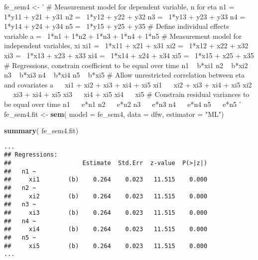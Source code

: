 \documentclass[]{interact}
\theoremstyle{plain}%
\theoremstyle{definition}
\theoremstyle{remark}
\newenvironment{Shaded}{\begin{snugshade}}{\end{snugshade}}
\newcommand{\DataTypeTok}[1]{\textcolor[rgb]{0.13,0.29,0.53}{#1}}
\newcommand{\KeywordTok}[1]{\textcolor[rgb]{0.13,0.29,0.53}{\textbf{#1}}}
\newcommand{\NormalTok}[1]{#1}
\newcommand{\StringTok}[1]{\textcolor[rgb]{0.31,0.60,0.02}{#1}}
\begin{document}
\singlespacing

\begin{Shaded}
\begin{Highlighting}[]
\NormalTok{fe_sem4 <-}\StringTok{ '}
\StringTok{# Measurement model for dependent variable, n for eta}
\StringTok{n1 =~ 1*y11 + y21 + y31}
\StringTok{n2 =~ 1*y12 + y22 + y32}
\StringTok{n3 =~ 1*y13 + y23 + y33}
\StringTok{n4 =~ 1*y14 + y24 + y34}
\StringTok{n5 =~ 1*y15 + y25 + y35}
\StringTok{# Define individual effects variable }
\StringTok{a =~ 1*n1 + 1*n2 + 1*n3 + 1*n4 + 1*n5}
\StringTok{# Measurement model for independent variables, xi }
\StringTok{xi1 =~ 1*x11 + x21 + x31 }
\StringTok{xi2 =~ 1*x12 + x22 + x32}
\StringTok{xi3 =~ 1*x13 + x23 + x33}
\StringTok{xi4 =~ 1*x14 + x24 + x34}
\StringTok{xi5 =~ 1*x15 + x25 + x35}
\StringTok{# Regressions, constrain coefficient to be equal over time}
\StringTok{n1 ~ b*xi1}
\StringTok{n2 ~ b*xi2 }
\StringTok{n3 ~ b*xi3}
\StringTok{n4 ~ b*xi4}
\StringTok{n5 ~ b*xi5}
\StringTok{# Allow unrestricted correlation between eta and covariates}
\StringTok{a ~~ xi1 + xi2 + xi3 + xi4 + xi5}
\StringTok{xi1 ~~ xi2 + xi3 + xi4 + xi5}
\StringTok{xi2 ~~ xi3 + xi4 + xi5}
\StringTok{xi3 ~~ xi4 + xi5}
\StringTok{xi4 ~~ xi5}
\StringTok{# Constrain residual variances to be equal over time}
\StringTok{n1 ~~ e*n1}
\StringTok{n2 ~~ e*n2}
\StringTok{n3 ~~ e*n3}
\StringTok{n4 ~~ e*n4}
\StringTok{n5 ~~ e*n5}
\StringTok{'}
\NormalTok{fe_sem4.fit <-}\StringTok{ }\KeywordTok{sem}\NormalTok{( }\DataTypeTok{model =}\NormalTok{ fe_sem4, }
                    \DataTypeTok{data =}\NormalTok{ dfw, }
                    \DataTypeTok{estimator =} \StringTok{"ML"}\NormalTok{)}
\end{Highlighting}
\end{Shaded}

\doublespacing

\singlespacing

\begin{Shaded}
\begin{Highlighting}[]
\KeywordTok{summary}\NormalTok{( fe_sem4.fit)}
\end{Highlighting}
\end{Shaded}

\begin{verbatim}
...
## Regressions:
##                    Estimate  Std.Err  z-value  P(>|z|)
##   n1 ~                                                
##     xi1        (b)    0.264    0.023   11.515    0.000
##   n2 ~                                                
##     xi2        (b)    0.264    0.023   11.515    0.000
##   n3 ~                                                
##     xi3        (b)    0.264    0.023   11.515    0.000
##   n4 ~                                                
##     xi4        (b)    0.264    0.023   11.515    0.000
##   n5 ~                                                
##     xi5        (b)    0.264    0.023   11.515    0.000
...
\end{verbatim}
\end{document}
